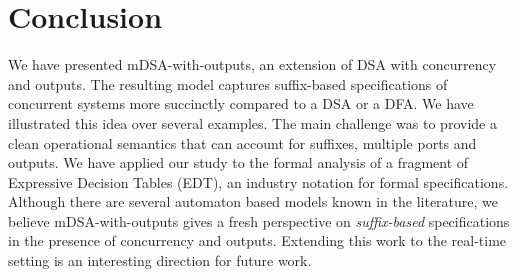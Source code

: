 \section{Conclusion}

We have presented mDSA-with-outputs, an extension of DSA with concurrency and outputs. The resulting model captures suffix-based specifications of concurrent systems more succinctly compared to a DSA or a DFA. We have illustrated this idea over several examples. The main challenge was to provide a clean operational semantics that can account for suffixes, multiple ports and outputs. We have applied our study to the formal analysis of a fragment of Expressive Decision Tables (EDT), an industry notation for formal specifications. Although there are several automaton based models known in the literature, we believe mDSA-with-outputs gives a fresh perspective on \emph{suffix-based} specifications in the presence of concurrency and outputs. Extending this work to the real-time setting is an interesting direction for future work. 